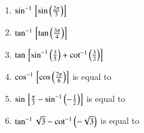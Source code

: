 \begin{enumerate}[label=\thesubsection.\arabic*,ref=\thesubsection.\theenumi,itemsep=1ex]
	\item 
		$\sin^{-1}{}\left[\sin\left(\frac{2\pi}{3}\right)\right]$ 
	\item 
		$\tan^{-1}{}\left[\tan\left(\frac{3\pi}{4}\right)\right]$ 
	\item 
		$\tan{}\left[\sin^{-1}\left(\frac{3}{5}\right)+\cot^{-1}\left(\frac{3}{2}\right)\right]$
	\item 
		$\cos^{-1}{}\left[\cos \left(\frac{7\pi}{6}\right)\right]$ 
		is equal to 
\begin{enumerate}
\end{enumerate}
	\item 
		$\sin{}\left[\frac{\pi}{3}-\sin^{-1}\left(-\frac{1}{2}\right)\right]$ 
		is equal to 
\begin{enumerate}
\end{enumerate}
	\item 
		$\tan^{-1}\sqrt{3}-\cot^{-1}\left(-\sqrt{3}\right)$ 
		is equal to 
\begin{enumerate}
\end{enumerate}
\end{enumerate}

